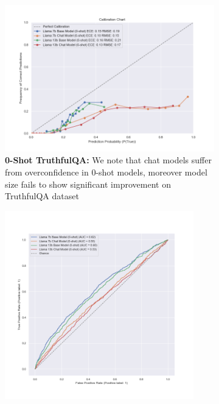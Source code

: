 \documentclass[11pt]{article}
\begin{document}
\begin{figure}
     \centering
     \begin{subfigure}[b]{0.60\textwidth}
         \centering \includegraphics[width=1.0\textwidth]{figures/0-shot-truthful_qa.png}
         \caption{\textbf{0-Shot TruthfulQA:} We note that chat models suffer from overconfidence in 0-shot models, moreover model size fails to show significant improvement on TruthfulQA dataset}
         \label{fig:0-shot-truthfulqa}
     \end{subfigure}
     \hfill
     \begin{subfigure}[b]{0.38\textwidth}
         \centering \includegraphics[width=0.9\textwidth]{figures/0-shot-truthful_qa-roc-roc.png}

\end{subfigure}
\end{figure}
\end{document}
